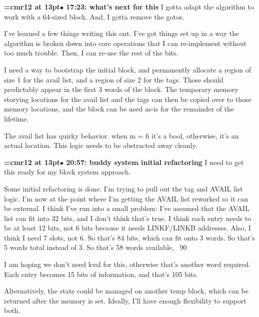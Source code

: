 {\smallskip\noindent\bf\font\titlefont=cmr12 at 13pt\titlefont $\bullet$ 17:23: what's next for this}\smallskip
I gotta adapt the algorithm to work with a 64-sized block. And, I gotta remove the gotos.
\par

I've learned a few things writing this out. I've got things set up in a way the algorithm is broken down into core operations that I can re-implement without too much trouble. Then, I can re-use the rest of the bits.
\par

I need a way to bootstrap the initial block, and permanently allocate a region of size 1 for the avail list, and a region of size 2 for the tags. Those should predictably appear in the first 3 words of the block. The temporary memory storying locations for the avail list and the tags can then be copied over to those memory locations, and the block can be used as-is for the remainder of the lifetime.
\par

The avail list has quirky behavior. when m = 6 it's a bool, otherwise, it's an actual location. This logic needs to be abstracted away cleanly.
\par

{\smallskip\noindent\bf\font\titlefont=cmr12 at 13pt\titlefont $\bullet$ 20:57: buddy system initial refactoring}\smallskip
I need to get this ready for my block system approach.
\par

Some initial refactoring is done. I'm trying to pull out the tag and AVAIL list logic. I'm now at the point where I'm getting the AVAIL list reworked so it can be external. I think I've run into a small problem: I've assumed that the AVAIL list can fit into 32 bits, and I don't think that's true. I think each entry needs to be at least 12 bits, not 6 bits because it needs LINKF/LINKB addresses. Also, I think I need 7 slots, not 6. So that's 84 bits, which can fit onto 3 words. So that's 5 words total instead of 3. So that's 58 words available, ~90%
\par

I am hoping we don't need kval for this, otherwise that's another word required. Each entry becomes 15 bits of information, and that's 105 bits.
\par

Alternatively, the state could be managed on another temp block, which can be returned after the memory is set. Ideally, I'll have enough flexibility to support both.
\par


